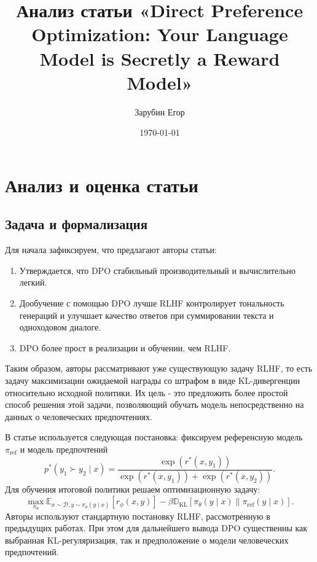 \documentclass[11pt,a4paper]{article}
\title{\vspace{-1.5cm}\textbf{Анализ статьи «Direct Preference Optimization: Your Language Model is Secretly a Reward Model»}}
\author{Зарубин Егор}
\date{\today}
\theoremstyle{remark}
\begin{document}
\maketitle
\vspace{-0.8cm}

\section{Анализ и оценка статьи}

\subsection{Задача и формализация}
Для начала зафиксируем, что предлагают авторы статьи:
\begin{enumerate}
     в обычном пайплайне RLHF, используемом в предыдущих работах и состоящем из трех этапов, заменить обучение отдельной модели награды и последующую RL-оптимизацию политики одним этапом обучения.
    \item Утверждается, что DPO стабильный производительный и вычислительно легкий.
    \item Дообучение с помощью DPO лучше RLHF контролирует тональность генераций и улучшает качество ответов при суммировании текста и одноходовом диалоге.
    \item DPO более прост в реализации и обучении, чем RLHF.
\end{enumerate}

Таким образом, авторы рассматривают уже существующую задачу RLHF, то есть задачу максимизации ожидаемой награды со штрафом в виде KL-дивергенции относительно исходной политики. Их цель - это предложить более простой способ решения этой задачи, позволяющий обучать модель непосредственно на данных о человеческих предпочтениях.

В статье используется следующая постановка: фиксируем референсную модель $\pi_{\text{ref}}$ и модель предпочтений
$$p^*(y_1 \succ y_2 \mid x) = \frac{\exp (r^*(x, y_1))}{\exp (r^*(x, y_1)) + \exp (r^*(x, y_2))}.$$
Для обучения итоговой политики решаем оптимизационную задачу:
$$\max_{\pi_\theta} \mathbb{E}_{x \sim \mathcal{D}, y \sim \pi_\theta(y \mid x)} [r_\phi(x, y)] - \beta \mathbb{D}_{\text{KL}} [\pi_\theta(y \mid x) \parallel \pi_{\text{ref}}(y \mid x)].$$
Авторы используют стандартную постановку RLHF, рассмотренную в предыдущих работах. При этом для дальнейшего вывода DPO существенны как выбранная KL-регуляризация, так и предположение о модели человеческих предпочтений.
\end{document}
